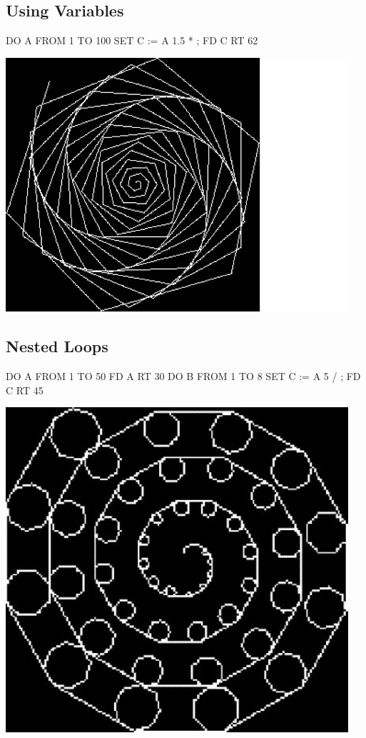 \subsection*{Using Variables}
\begin{codesnippet}
{
   DO A FROM 1 TO 100 {
      SET C := A 1.5 * ;
      FD C
      RT 62
   }
}
\end{codesnippet}
\begin{center}
\includegraphics[width=5in]{../Pictures/spiral.jpg}
\end{center}

\subsection*{Nested Loops}
\begin{codesnippet}
{
   DO A FROM 1 TO 50 {
      FD A
      RT 30
      DO B FROM 1 TO 8 {
         SET C := A 5 / ;
         FD C
         RT 45
      }
   }
}
\end{codesnippet}
\begin{center}
\includegraphics[width=5in]{../Pictures/nstdloop.jpg}
\end{center}

